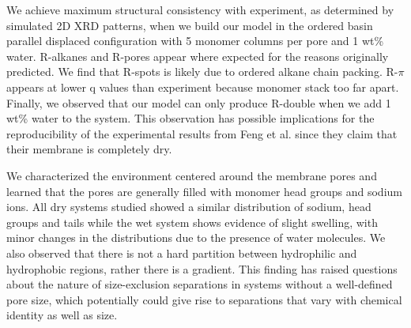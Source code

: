 \documentclass[journal=jpcbfk,manuscript=article]{achemso}
\begin{document}
  We achieve maximum structural consistency with experiment, as determined by simulated
  2D XRD patterns, when we build our model in the ordered basin parallel displaced
  configuration with 5 monomer columns per pore and 1 wt\% water. R-alkanes and R-pores
  appear where expected for the reasons originally predicted. We find that R-spots
  is likely due to ordered alkane chain packing. R-$\pi$ appears at lower q values than
  experiment because monomer stack too far apart. Finally, we observed that our model
  can only produce R-double when we add 1 wt\% water to the system. This observation has
  possible implications for the reproducibility of the experimental results from Feng 
  et al. since they claim that their membrane is completely dry. 

  

  We characterized the environment centered around the membrane pores and
  learned that the pores are generally filled with monomer head groups and sodium
  ions. All dry systems studied showed a similar distribution of sodium, head
  groups and tails while the wet system shows evidence of slight swelling, with
  minor changes in the distributions due to the presence of water molecules. We
  also observed that there is not a hard partition between hydrophilic and
  hydrophobic regions, rather there is a gradient. This finding has raised
  questions about the nature of size-exclusion separations in systems without a
  well-defined pore size, which potentially could give rise to separations that
  vary with chemical identity as well as size. 

\end{document}

